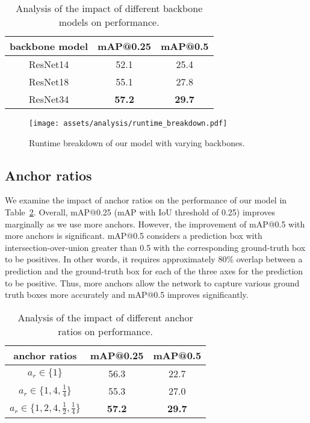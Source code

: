 \documentclass[runningheads]{llncs}
\begin{document}
\begin{table}[]
    \centering
    \begin{tabular}{c||cc}
    \toprule
    backbone model & mAP@0.25 & mAP@0.5 \\ \midrule
    ResNet14 & 52.1 &  25.4  \\
    ResNet18 & 55.1 &  27.8 \\ \midrule
    ResNet34 & \textbf{57.2}  & \textbf{29.7}   \\ \bottomrule
    \end{tabular}
    \vspace{1em}
    \caption{Analysis of the impact of different backbone models on performance.}
    \label{tab:backbone}
\end{table}

\begin{figure}
    \centering
    \texttt{[image: assets/analysis/runtime\_breakdown.pdf]}
    \caption{Runtime breakdown of our model with varying backbones.}
    \label{fig:runtime_breakdown}
\end{figure}

\subsection{Anchor ratios}

We examine the impact of anchor ratios on the performance of our model in Table~\ref{tab:anchor_ratios}. Overall, mAP@0.25 (mAP with IoU threshold of 0.25) improves marginally as we use more anchors. However, the improvement of mAP@0.5 with more anchors is significant. mAP@0.5 considers a prediction box with intersection-over-union greater than 0.5 with the corresponding ground-truth box to be positives. In other words, it requires approximately 80\% overlap between a prediction and the ground-truth box for each of the three axes for the prediction to be positive. Thus, more anchors allow the network to capture various ground truth boxes more accurately and mAP@0.5 improves significantly.

\begin{table}[]
    \centering
    \begin{tabular}{c||cc}
    \toprule
    anchor ratios & mAP@0.25 & mAP@0.5  \\ \midrule
    $a_r \in \{1\}$ & 56.3 &  22.7   \\
    $a_r \in \{1, 4, \frac{1}{4}\}$ & 55.3 &  27.0  \\ \midrule
    $a_r \in \{1, 2, 4, \frac{1}{2}, \frac{1}{4}\}$ & \textbf{57.2}  & \textbf{29.7}  \\ \bottomrule
    \end{tabular}
    \vspace{1em}
    \caption{Analysis of the impact of different anchor ratios on performance.}
    \label{tab:anchor_ratios}
\end{table}
\end{document}
